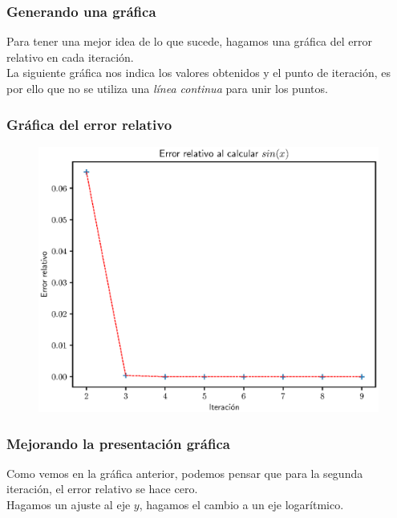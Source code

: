 \documentclass[12pt]{beamer}
\begin{document}
\begin{frame}
\frametitle{Generando una gráfica}
Para tener una mejor idea de lo que sucede, hagamos una gráfica del error relativo en cada iteración.
\\
\bigskip
\pause
La siguiente gráfica nos indica los valores obtenidos y el punto de iteración, es por ello que no se utiliza una \emph{línea continua} para unir los puntos.
\end{frame}
\begin{frame}
\frametitle{Gráfica del error relativo}
\begin{figure}
    \centering
    \includegraphics[scale=0.6]{Imagenes/Plot_Serie_Seno_01.eps}
\end{figure}
\end{frame}
\begin{frame}
\frametitle{Mejorando la presentación gráfica}
Como vemos en la gráfica anterior, podemos pensar que para la segunda iteración, el error relativo se hace cero.
\\
\bigskip
\pause
Hagamos un ajuste al eje $y$, \pause hagamos el cambio a un eje logarítmico.
\end{frame}
\end{document}
